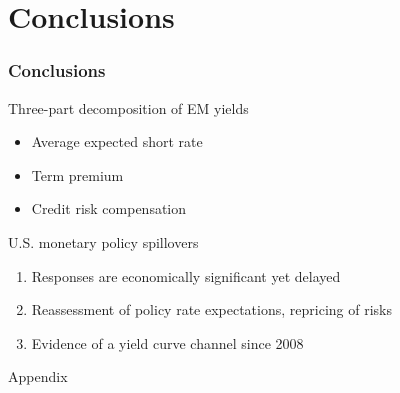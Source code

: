 \documentclass[12pt, aspectratio=169, xcolor=dvipsnames]{beamer}
\begin{document}
\section{Conclusions}

\begin{frame}
\frametitle{Conclusions}

\alert{Three}-part decomposition of EM yields
\begin{itemize}
\item Average expected short rate \item Term premium \item Credit risk compensation
\end{itemize}

U.S. monetary policy \alert{spillovers}
\begin{enumerate}
\item Responses are economically significant yet delayed
\item Reassessment of policy rate expectations, repricing of risks
\item Evidence of a yield curve channel since 2008
\end{enumerate}

\end{frame}

\begin{frame}[standout]
Appendix
\end{frame}

\appendix
\end{document}
